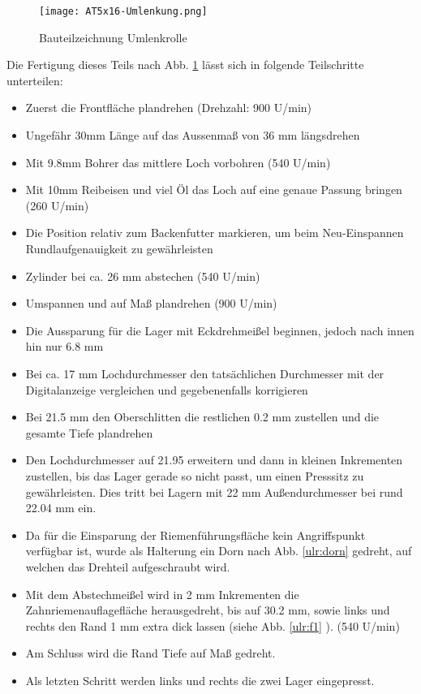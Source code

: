 \begin{figure}[H]
    \centering
    \texttt{[image: AT5x16-Umlenkung.png]}
    \caption{Bauteilzeichnung Umlenkrolle}
    \label{UmlenkrolleBTZ}
\end{figure}

Die Fertigung dieses Teils nach Abb. \ref{UmlenkrolleBTZ} lässt sich in folgende Teilschritte unterteilen:
\begin{itemize}
    \setlength\itemsep{-1mm} 
    \item Zuerst die Frontfläche plandrehen (Drehzahl: 900 U/min)
    \item Ungefähr 30mm Länge auf das Aussenmaß von 36 mm längsdrehen
    \item Mit 9.8mm Bohrer das mittlere Loch vorbohren (540 U/min)
    \item Mit 10mm Reibeisen und viel Öl das Loch auf eine genaue Passung bringen (260 U/min)
    \item Die Position relativ zum Backenfutter markieren, um beim Neu-Einspannen Rundlaufgenauigkeit zu gewährleisten
    \item Zylinder bei ca. 26 mm abstechen (540 U/min)
    \item Umspannen und auf Maß plandrehen (900 U/min)
    \item Die Aussparung für die Lager mit Eckdrehmeißel beginnen, jedoch nach innen hin nur 6.8 mm
    \item Bei ca. 17 mm Lochdurchmesser den tatsächlichen Durchmesser mit der Digitalanzeige vergleichen und gegebenenfalls korrigieren
    \item Bei 21.5 mm den Oberschlitten die restlichen 0.2 mm zustellen und die gesamte Tiefe plandrehen
    \item Den Lochdurchmesser auf 21.95 erweitern und dann in kleinen Inkrementen zustellen, bis das Lager gerade so nicht passt, um einen Presssitz zu gewährleisten. Dies tritt bei Lagern mit 22 mm Außendurchmesser bei rund 22.04 mm ein.
    \item Da für die Einsparung der Riemenführungsfläche kein Angriffspunkt verfügbar ist, wurde als Halterung ein Dorn nach Abb. \ref{ulr:dorn} gedreht, auf welchen das Drehteil aufgeschraubt wird.
    \item Mit dem Abstechmeißel wird in 2 mm Inkrementen die Zahnriemenauflagefläche herausgedreht, bis auf 30.2 mm, sowie links und rechts den Rand 1 mm extra dick lassen (siehe Abb. \ref{ulr:f1} ). (540 U/min)
    \item Am Schluss wird die Rand Tiefe auf Maß gedreht.
    \item Als letzten Schritt werden links und rechts die zwei Lager eingepresst.
\end{itemize}

